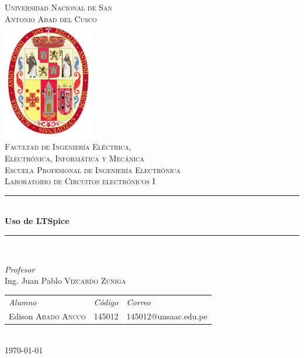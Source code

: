 \documentclass[a4paper]{article} %
\begin{document}

\begin{titlepage}
	\newcommand{\HRule}{\rule{\linewidth}{0.5mm}} 
	\center
	\textsc{\LARGE  Universidad Nacional de San \\[0.2cm] Antonio Abad del Cusco}\\[1.5cm] 
	\includegraphics[width=4cm]{IMAGENES/escudo}\\[1cm]
	\textsc{\Large Facultad de Ingeniería Eléctrica, \\ Electrónica, Informática y Mecánica}\\[0.5cm] 
	\textsc{\large Escuela Profesional de Ingeniería Electrónica}\\[0.5cm]
	\textsc{\Large Laboratorio de Circuitos electrónicos I}\\[0.5cm]
	\HRule \\[0.4cm]
	{ \huge \bfseries Uso de LTSpice}\\[0.4cm] 
	\HRule \\[1.5cm]
	\begin{minipage}{\textwidth}
		\center 
		
		\emph{Profesor} \\
		Ing. Juan Pablo \textsc{Vizcardo Zuniga} \\[1cm]
		
		\begin{tabular}{lll}
			\emph{Alumno} & \emph{Código} & \emph{Correo}\\
			Edison \textsc{Abado Ancco } & 145012 & 145012@unsaac.edu.pe\\
			
		\end{tabular}
	\end{minipage}\\[2cm]
	\today
\end{titlepage}



\newpage
\end{document}
